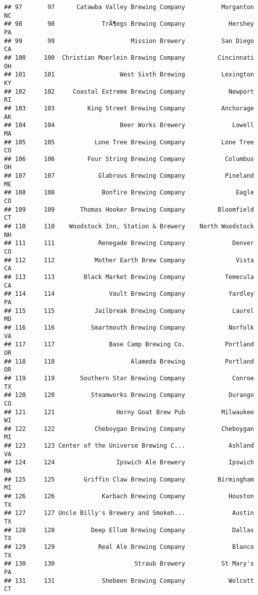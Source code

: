 \documentclass[
]{article}
\begin{document}
\begin{verbatim}
## 97       97      Catawba Valley Brewing Company          Morganton    NC
## 98       98             TrÃ¶egs Brewing Company            Hershey    PA
## 99       99                     Mission Brewery          San Diego    CA
## 100     100  Christian Moerlein Brewing Company         Cincinnati    OH
## 101     101                  West Sixth Brewing          Lexington    KY
## 102     102     Coastal Extreme Brewing Company            Newport    RI
## 103     103         King Street Brewing Company          Anchorage    AK
## 104     104                  Beer Works Brewery             Lowell    MA
## 105     105           Lone Tree Brewing Company          Lone Tree    CO
## 106     106         Four String Brewing Company           Columbus    OH
## 107     107            Glabrous Brewing Company           Pineland    ME
## 108     108             Bonfire Brewing Company              Eagle    CO
## 109     109       Thomas Hooker Brewing Company         Bloomfield    CT
## 110     110    Woodstock Inn, Station & Brewery    North Woodstock    NH
## 111     111            Renegade Brewing Company             Denver    CO
## 112     112           Mother Earth Brew Company              Vista    CA
## 113     113        Black Market Brewing Company           Temecula    CA
## 114     114               Vault Brewing Company            Yardley    PA
## 115     115           Jailbreak Brewing Company             Laurel    MD
## 116     116          Smartmouth Brewing Company            Norfolk    VA
## 117     117               Base Camp Brewing Co.           Portland    OR
## 118     118                     Alameda Brewing           Portland    OR
## 119     119       Southern Star Brewing Company             Conroe    TX
## 120     120          Steamworks Brewing Company            Durango    CO
## 121     121                 Horny Goat Brew Pub          Milwaukee    WI
## 122     122           Cheboygan Brewing Company          Cheboygan    MI
## 123     123 Center of the Universe Brewing C...            Ashland    VA
## 124     124                 Ipswich Ale Brewery            Ipswich    MA
## 125     125        Griffin Claw Brewing Company         Birmingham    MI
## 126     126             Karbach Brewing Company            Houston    TX
## 127     127 Uncle Billy's Brewery and Smokeh...             Austin    TX
## 128     128          Deep Ellum Brewing Company             Dallas    TX
## 129     129            Real Ale Brewing Company             Blanco    TX
## 130     130                      Straub Brewery          St Mary's    PA
## 131     131             Shebeen Brewing Company            Wolcott    CT

\end{verbatim}
\end{document}

